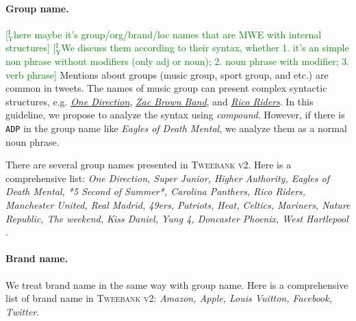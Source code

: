\documentclass[11pt,a4paper]{article}
\newcommand{\yicomment}[1]{\textcolor{green}{[$_\mathrm{Y}^\mathrm{I}$#1]}}
\begin{document}
\paragraph{Group name.}\yicomment{here maybe it's group/org/brand/loc names that are MWE with internal structures}
\yicomment{We discuss them according to their syntax, whether 1. it's an simple non phrase without modifiers (only adj or noun); 2. noun phrase with modifier; 3. verb phrase}
Mentions about groups (music group, sport group, and etc.) are common in tweets.
The names of music group can present complex syntactic structures,
e.g. \underline{\textit{One Direction}}, \underline{\textit{Zac Brown Band}},
and \underline{\textit{Rico Riders}}.
In this guideline, we propose to analyze the syntax using \textit{compound}.
However, if there is \texttt{ADP} in the group name like \textit{Eagles of Death Mental}, we analyze them as a normal noun phrase.

There are several group names presented in \textsc{Tweebank v2}. Here is a comprehensive list:
\textit{One Direction, Super Junior, 
	Higher Authority,
	Eagles of Death Mental, 
	*5 Second of Summer*,
	Carolina Panthers, Rico Riders, Manchester United, Real Madrid,
	49ers, Patriots, Heat, Celtics,
	Mariners,
	Nature Republic,
	The weekend,
	Kiss Daniel,
	Yung 4,
	Doncaster Phoenix,
	West Hartlepool
}.

\paragraph{Brand name.}
We treat brand name in the same way with group name.
Here is a comprehensive list of brand name in \textsc{Tweebank v2}:
\textit{Amazon, Apple, Louis Vuitton, Facebook, Twitter}.
\end{document}
